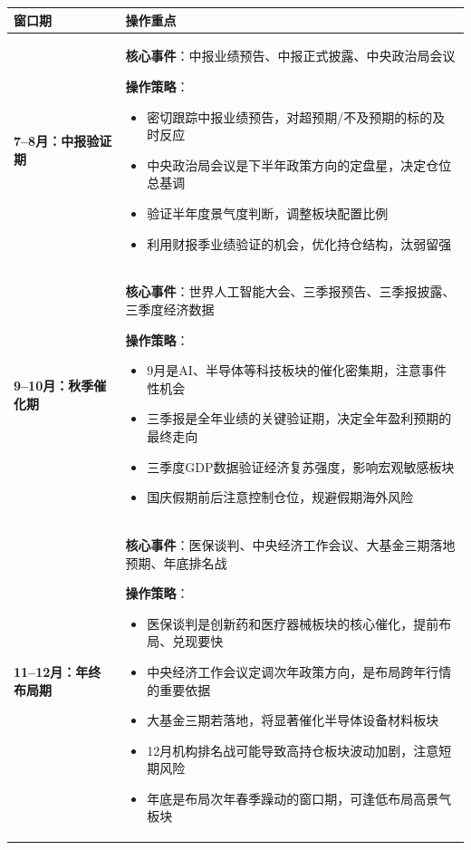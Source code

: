 \begin{exhibitbox}[表9-33：2026年下半年三大关键窗口期]
\scriptsize
\setlength{\tabcolsep}{3pt}
\renewcommand{\arraystretch}{1.15}
\begin{tabularx}{\textwidth}{l X}
\toprule
\textbf{窗口期} & \textbf{操作重点} \\
\midrule
\textbf{7--8月：中报验证期} & 
\textbf{核心事件}：中报业绩预告、中报正式披露、中央政治局会议

\textbf{操作策略}：
\begin{itemize}[leftmargin=1.2em]
\item 密切跟踪中报业绩预告，对超预期/不及预期的标的及时反应
\item 中央政治局会议是下半年政策方向的定盘星，决定仓位总基调
\item 验证半年度景气度判断，调整板块配置比例
\item 利用财报季业绩验证的机会，优化持仓结构，汰弱留强
\end{itemize}
\\
\midrule
\textbf{9--10月：秋季催化期} & 
\textbf{核心事件}：世界人工智能大会、三季报预告、三季报披露、三季度经济数据

\textbf{操作策略}：
\begin{itemize}[leftmargin=1.2em]
\item 9月是AI、半导体等科技板块的催化密集期，注意事件性机会
\item 三季报是全年业绩的关键验证期，决定全年盈利预期的最终走向
\item 三季度GDP数据验证经济复苏强度，影响宏观敏感板块
\item 国庆假期前后注意控制仓位，规避假期海外风险
\end{itemize}
\\
\midrule
\textbf{11--12月：年终布局期} & 
\textbf{核心事件}：医保谈判、中央经济工作会议、大基金三期落地预期、年底排名战

\textbf{操作策略}：
\begin{itemize}[leftmargin=1.2em]
\item 医保谈判是创新药和医疗器械板块的核心催化，提前布局、兑现要快
\item 中央经济工作会议定调次年政策方向，是布局跨年行情的重要依据
\item 大基金三期若落地，将显著催化半导体设备材料板块
\item 12月机构排名战可能导致高持仓板块波动加剧，注意短期风险
\item 年底是布局次年春季躁动的窗口期，可逢低布局高景气板块
\end{itemize}
\\
\bottomrule
\end{tabularx}
\end{exhibitbox}


